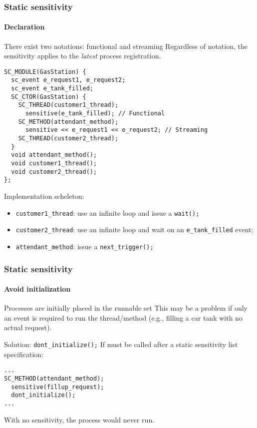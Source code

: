 \begin{frame}[fragile]
\frametitle{Static sensitivity}
\framesubtitle{Declaration}

{\scriptsize
\begin{block}{{\small There exist two notations: functional and streaming}}
\vspace{0.1em}
Regardless of notation, the sensitivity applies to the {\em latest} process registration.
\begin{verbatim}
SC_MODULE(GasStation) {
  sc_event e_request1, e_request2;
  sc_event e_tank_filled;
  SC_CTOR(GasStation) {
    SC_THREAD(customer1_thread);
      sensitive(e_tank_filled); // Functional
    SC_METHOD(attendant_method);
      sensitive << e_request1 << e_request2; // Streaming
    SC_THREAD(customer2_thread);
  }
  void attendant_method();
  void customer1_thread();
  void customer2_thread();
};
\end{verbatim}
\vspace{-0.5em}
\pause
Implementation scheleton:
\begin{itemize}
\item \texttt{customer1\_thread}: use an infinite loop and issue a \texttt{wait();}
\item \texttt{customer2\_thread}: use an infinite loop and wait on an \texttt{e\_tank\_filled} event; 
\item \texttt{attendant\_method}: issue a \texttt{next\_trigger();}
\end{itemize}
\end{block}
}
\end{frame}

\begin{frame}[fragile]
\frametitle{Static sensitivity}
\framesubtitle{Avoid initialization}

\begin{block}{Processes are initially placed in the runnable set}
This may be a problem if only an event is required to run the thread/method (e.g., filling a car tank with no actual request).
\end{block}
\pause
\begin{block}{Solution: \texttt{dont\_initialize();}}
If must be called after a static sensitivity list specification:
\begin{verbatim}
...
SC_METHOD(attendant_method);
  sensitive(fillup_request);
  dont_initialize();
...
\end{verbatim}
With no sensitivity, the process would never run.
\end{block}
\end{frame}
